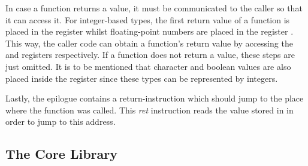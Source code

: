 In case a function returns a value, it must be communicated to the caller so that it can access it.
For integer-based types, the first return value of a function is placed in the register 
whilst floating-point numbers are placed in the register .
This way, the caller code can obtain a function's return value by accessing the  and 
registers respectively. If a function does not return a value, these steps are just omitted.
It is to be mentioned that character and boolean values are also placed inside the  register since these types can be represented by integers.

Lastly, the epilogue contains a return-instruction which should jump to the place where the function was called.
This \emph{ret} instruction reads the value stored in  in order to jump to this address.



%
%

\subsection{The Core Library}

